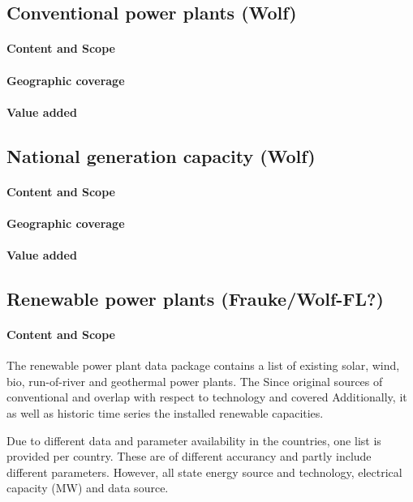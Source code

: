 \documentclass[article]{elsarticle}
\begin{document}
\subsection{Conventional power plants (Wolf)}
\paragraph{Content and Scope}
\paragraph{Geographic coverage}
\paragraph{Value added}

\subsection{National generation capacity (Wolf)}
\paragraph{Content and Scope}
\paragraph{Geographic coverage}
\paragraph{Value added}

\subsection{Renewable power plants (Frauke/Wolf-FL?)}
\paragraph{Content and Scope}
The renewable power plant data package contains a list of existing solar, wind, bio, run-of-river and geothermal power plants. The Since original sources of conventional and overlap with respect to technology and covered Additionally, it  as well as historic time series the installed renewable capacities.

Due to different data and parameter availability in the countries, one list is provided per country. These are of different accurancy and partly include different parameters. However, all state energy source and technology, electrical capacity (MW) and data source.
\end{document}
